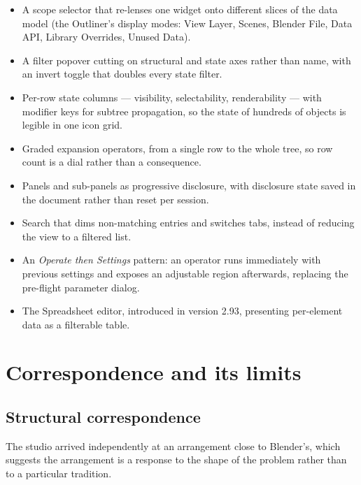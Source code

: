 \documentclass[11pt,a4paper]{article}
\begin{document}
\begin{itemize}
\item A scope selector that re-lenses one widget onto different slices of the
      data model (the Outliner's display modes: View Layer, Scenes, Blender
      File, Data API, Library Overrides, Unused Data).
\item A filter popover cutting on structural and state axes rather than name,
      with an invert toggle that doubles every state filter.
\item Per-row state columns --- visibility, selectability, renderability ---
      with modifier keys for subtree propagation, so the state of hundreds of
      objects is legible in one icon grid.
\item Graded expansion operators, from a single row to the whole tree, so row
      count is a dial rather than a consequence.
\item Panels and sub-panels as progressive disclosure, with disclosure state
      saved in the document rather than reset per session.
\item Search that dims non-matching entries and switches tabs, instead of
      reducing the view to a filtered list.
\item An \emph{Operate then Settings} pattern: an operator runs immediately with
      previous settings and exposes an adjustable region afterwards, replacing
      the pre-flight parameter dialog.
\item The Spreadsheet editor, introduced in version 2.93, presenting per-element
      data as a filterable table.
\end{itemize}

\section{Correspondence and its limits}

\subsection{Structural correspondence}

The studio arrived independently at an arrangement close to Blender's, which
suggests the arrangement is a response to the shape of the problem rather than
to a particular tradition.
\end{document}
